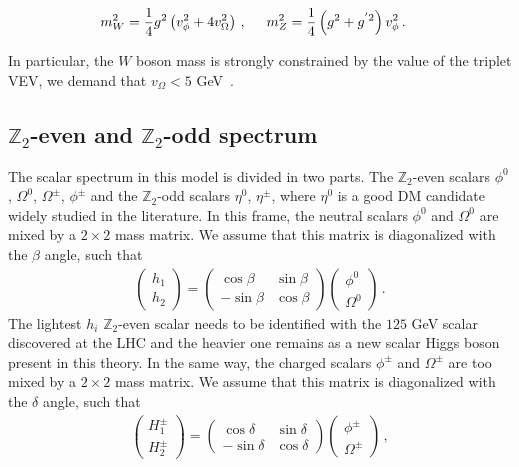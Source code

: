 \documentclass[12pt,letterpaper]{article}
\begin{document}
\begin{align}
\label{eq:mW-mZ}
m_W^2 &= \dfrac{1}{4}g^2\left(v_{\phi}^2+4v_{\Omega}^2\right)\,,\hspace{0.5 cm} 
m_Z^2=\dfrac{1}{4}\left(g^2+g^{'2}\right)v_{\phi}^2\,.
\end{align}

In particular, the $W$ boson mass is strongly constrained by the value of the triplet VEV, we demand that $v_{\Omega}< 5$ GeV~\cite{Agashe:2014kda}.

\subsection{$\mathbb{Z}_2$-even and $\mathbb{Z}_2$-odd spectrum}

The scalar spectrum in this model is divided in two parts. The $\mathbb{Z}_2$-even scalars $\phi^0$, $\Omega^0$, $\Omega^{\pm}$, $\phi^{\pm}$ and the $\mathbb{Z}_2$-odd scalars $\eta^0$, $\eta^{\pm}$, where $\eta^0$ is a good DM candidate widely studied in the literature.
In this frame, the neutral scalars $\phi^0$ and $\Omega^0$ are mixed by a $2\times 2$ mass matrix. We assume that this matrix is diagonalized with the $\beta$ angle, such that
\begin{align}
\label{eq:beta-mixing}
\begin{pmatrix}
h_1 \\ h_2 
\end{pmatrix}=
\begin{pmatrix}
\cos\beta & \sin\beta \\
-\sin\beta & \cos\beta
\end{pmatrix}
\begin{pmatrix}
\phi^0 \\ \Omega^0 
\end{pmatrix}\,.
\end{align} 
The lightest $h_i$ $\mathbb{Z}_2$-even scalar needs to be identified with the $125$ GeV scalar discovered at the LHC and the heavier one remains as a new scalar Higgs boson present in this theory.  
In the same way, the charged scalars $\phi^{\pm}$ and $\Omega^{\pm}$ are too mixed by a $2\times 2$ mass matrix. We assume that this matrix is diagonalized with the $\delta$ angle, such that
\begin{align}
\label{eq:delta-mixing}
\begin{pmatrix}
H_1^{\pm} \\ H_2^{\pm} 
\end{pmatrix}=
\begin{pmatrix}
\cos\delta & \sin\delta \\
-\sin\delta & \cos\delta
\end{pmatrix}
\begin{pmatrix}
\phi^{\pm} \\ \Omega^{\pm} 
\end{pmatrix}\,,
\end{align} 
\end{document}
